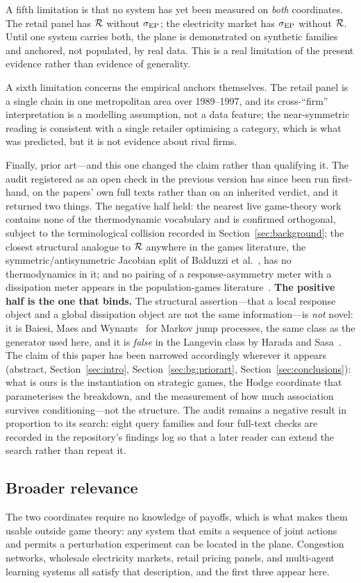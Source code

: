 A fifth limitation is that no system has yet been measured on \emph{both} coordinates. The
retail panel has $\mathcal{R}$ without $\sigma_{\mathrm{EP}}$; the electricity market has $\sigma_{\mathrm{EP}}$ without $\mathcal{R}$. Until
one system carries both, the plane is demonstrated on synthetic families and anchored, not
populated, by real data. This is a real limitation of the present evidence rather than
evidence of generality.

A sixth limitation concerns the empirical anchors themselves. The retail panel is a single
chain in one metropolitan area over 1989--1997, and its cross-``firm'' interpretation is a
modelling assumption, not a data feature; the near-symmetric reading is consistent with a
single retailer optimising a category, which is what was predicted, but it is not evidence
about rival firms.

Finally, prior art---and this one changed the claim rather than qualifying it. The audit
registered as an open check in the previous version has since been run first-hand, on the
papers' own full texts rather than on an inherited verdict, and it returned two things. The
negative half held: the nearest live game-theory work~\cite{legacci2024} contains none of the
thermodynamic vocabulary and is confirmed orthogonal, subject to the terminological collision
recorded in Section~\ref{sec:background}; the closest structural analogue to $\mathcal{R}$ anywhere in
the games literature, the symmetric/antisymmetric Jacobian split of Balduzzi et
al.~\cite{balduzzi2018}, has no thermodynamics in it; and no pairing of a response-asymmetry
meter with a dissipation meter appears in the population-games
literature~\cite{sandholm2010}. \textbf{The positive half is the one that binds.} The
structural assertion---that a local response object and a global dissipation object are not
the same information---is \emph{not} novel: it is Baiesi, Maes and
Wynants~\cite{baiesi2009} for Markov jump processes, the same class as the generator used
here, and it is \emph{false} in the Langevin class by Harada and Sasa~\cite{haradasasa2005}.
The claim of this paper has been narrowed accordingly wherever it appears (abstract,
Section~\ref{sec:intro}, Section~\ref{sec:bg:priorart}, Section~\ref{sec:conclusions}): what
is ours is the instantiation on strategic games, the Hodge coordinate that parameterises the
breakdown, and the measurement of how much association survives conditioning---not the
structure. The audit remains a negative result in proportion to its search: eight query
families and four full-text checks are recorded in the repository's findings log so that a
later reader can extend the search rather than repeat it.

\subsection{Broader relevance}
The two coordinates require no knowledge of payoffs, which is what makes them usable outside
game theory: any system that emits a sequence of joint actions and permits a perturbation
experiment can be located in the plane. Congestion networks, wholesale electricity markets,
retail pricing panels, and multi-agent learning systems all satisfy that description, and
the first three appear here.
